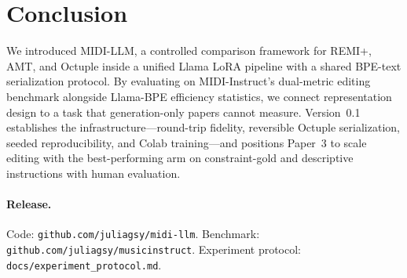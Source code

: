 \section{Conclusion}

We introduced MIDI-LLM, a controlled comparison framework for REMI+, AMT, and Octuple inside a unified Llama LoRA pipeline with a shared BPE-text serialization protocol. By evaluating on MIDI-Instruct's dual-metric editing benchmark alongside Llama-BPE efficiency statistics, we connect representation design to a task that generation-only papers cannot measure. Version~0.1 establishes the infrastructure---round-trip fidelity, reversible Octuple serialization, seeded reproducibility, and Colab training---and positions Paper~3 to scale editing with the best-performing arm on constraint-gold and descriptive instructions with human evaluation.

\paragraph{Release.}
Code: \texttt{github.com/juliagsy/midi-llm}. Benchmark: \texttt{github.com/juliagsy/musicinstruct}. Experiment protocol: \texttt{docs/experiment\_protocol.md}.
